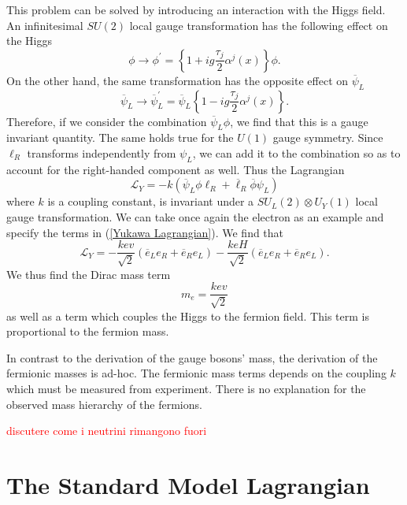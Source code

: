 \documentclass[10pt,a4paper]{book}
\newcommand\todo[1]{\textcolor{red}{#1}}
\begin{document}
This problem can be solved by introducing an interaction with the Higgs field. An infinitesimal $SU(2)$ local gauge transformation has the following effect on the Higgs
\begin{equation}
\phi \rightarrow \phi^\prime = \left\lbrace 1 + ig\frac{\tau_j}{2}\alpha^j(x)\right\rbrace\phi.
\end{equation} 
On the other hand, the same transformation has the opposite effect on $\overline{\psi}_L$
\begin{equation}
\overline{\psi}_L \rightarrow \overline{\psi}^\prime_L = \overline{\psi}_L\left\lbrace 1 - ig\frac{\tau_j}{2}\alpha^j(x) \right\rbrace.
\end{equation}
Therefore, if we consider the combination $\overline{\psi}_L\phi$, we find that this is a gauge invariant quantity. The same holds true for the $U(1)$ gauge symmetry.
Since $\ell_R$ transforms independently from $\psi_L$, we can add it to the combination so as to account for the right-handed component as well. Thus the Lagrangian
\begin{equation}
\label{Yukawa Lagrangian}
\mathcal{L}_Y = -k\left(\overline{\psi}_L\phi\ell_R + \overline{\ell}_R\overline{\phi}\psi_L\right)
\end{equation}
where $k$ is a coupling constant, is invariant under a $SU_L(2)\otimes U_Y(1)$ local gauge transformation.
We can take once again the electron as an example and specify the terms in (\ref{Yukawa Lagrangian}). We find that
\begin{equation}
\mathcal{L}_Y = -\frac{kev}{\sqrt{2}}\left(\overline{e}_L e_R +\overline{e}_R e_L\right) - \frac{keH}{\sqrt{2}}\left(\overline{e}_L e_R +\overline{e}_R e_L\right).
\end{equation}
We thus find the Dirac mass term
\begin{equation}
m_e = \frac{kev}{\sqrt{2}}
\end{equation}
as well as a term which couples the Higgs to the fermion field. This term is proportional to the fermion mass. 

In contrast to the derivation of the gauge bosons' mass, the derivation of the fermionic masses is ad-hoc. The fermionic mass terms depends on the coupling $k$ which must be measured from experiment. There is no explanation for the observed mass hierarchy of the fermions.

\todo{discutere come i neutrini rimangono fuori}
\section{The Standard Model Lagrangian}
\end{document}
